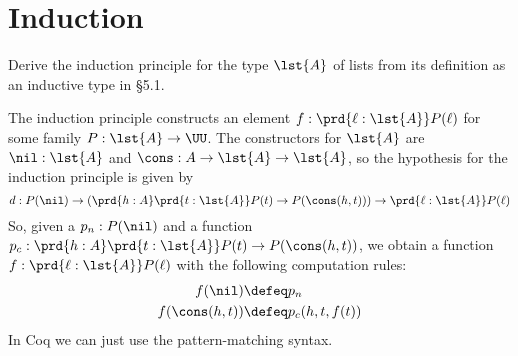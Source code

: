 \begin{coqdoccode}
\end{coqdoccode}
\section{Induction}



Derive the induction principle for the type $\lst{A}$ of lists from its
definition as an inductive type in \S5.1.


 \soln
The induction principle constructs an element $f : \prd{\ell:\lst{A}} P(\ell)$
for some family $P : \lst{A} \to \UU$.  The constructors for $\lst{A}$ are
$\nil : \lst{A}$ and $\cons : A \to \lst{A} \to \lst{A}$, so the hypothesis for
the induction principle is given by
\[
  d : P(\nil) 
      \to \left(\prd{h:A} \prd{t:\lst{A}}P(t) \to P(\cons(h, t))\right)
      \to \prd{\ell:\lst{A}}P(\ell)
\]
So, given a $p_{n} : P(\nil)$ and a function $p_{c} : \prd{h:A} \prd{t:\lst{A}}
P(t) \to P(\cons(h, t))$, we obtain a function $f : \prd{\ell:\lst{A}}P(\ell)$
with the following computation rules:
\begin{align*}
  f(\nil) &\defeq p_{n} \\
  f(\cons(h, t)) &\defeq p_{c}(h, t, f(t))
\end{align*}
In Coq we can just use the pattern-matching syntax.
